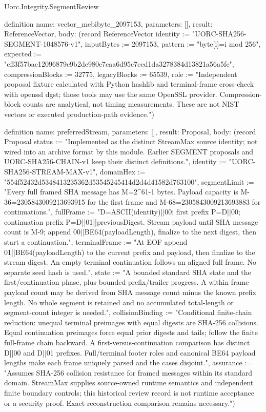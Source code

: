 \begin{lexlean}{Uorc.Integrity.SegmentReview}
\begin{semanticmodule}
definition{
  name: vector_mebibyte_2097153,
  parameters: [],
  result: ReferenceVector,
  body: (record ReferenceVector {identity := "UORC-SHA256-SEGMENT-1048576-v1", inputBytes := 2097153, pattern := "byte[i]=i mod 256", expected := "cff3f57bac12096879c9b2de980e7caa6d95c7eed1da3278384d13821a56a5fe", compressionBlocks := 32775, legacyBlocks := 65539, role := "Independent proposal fixture calculated with Python hashlib and terminal-frame cross-check with openssl dgst; those tools may use the same OpenSSL provider. Compression-block counts are analytical, not timing measurements. These are not NIST vectors or executed production-path evidence."})
}

definition{
  name: preferredStream,
  parameters: [],
  result: Proposal,
  body: (record Proposal {status := "Implemented as the distinct StreamMax source identity; not wired into an archive format by this module. Earlier SEGMENT proposals and UORC-SHA256-CHAIN-v1 keep their distinct definitions.", identity := "UORC-SHA256-STREAM-MAX-v1", domainHex := "554f52432d5348413235362d53545245414d2d4d41582d763100", segmentLimit := "Every full framed SHA message has M=2^61-1 bytes. Payload capacity is M-36=2305843009213693915 for the first frame and M-68=2305843009213693883 for continuations.", fullFrame := "D=ASCII(identity)||00; first prefix P=D||00; continuation prefix P=D||01||previousDigest. Stream payload until SHA message count is M-9; append 00||BE64(payloadLength), finalize to the next digest, then start a continuation.", terminalFrame := "At EOF append 01||BE64(payloadLength) to the current prefix and payload, then finalize to the stream digest. An empty terminal continuation follows an aligned full frame. No separate seed hash is used.", state := "A bounded standard SHA state and the first/continuation phase, plus bounded prefix/trailer progress. A within-frame payload count may be derived from SHA message count minus the known prefix length. No whole segment is retained and no accumulated total-length or segment-count integer is needed.", collisionBinding := "Conditional finite-chain reduction: unequal terminal preimages with equal digests are SHA-256 collisions. Equal continuation preimages force equal prior digests and tails; follow the finite full-frame chain backward. A first-versus-continuation comparison has distinct D||00 and D||01 prefixes. Full/terminal footer roles and canonical BE64 payload lengths make each frame uniquely parsed and the cases disjoint.", assurance := "Assumes SHA-256 collision resistance for framed messages within its standard domain. StreamMax supplies source-owned runtime semantics and independent finite boundary controls; this historical review record is not runtime acceptance or a security proof. Exact reconstruction comparison remains necessary."})
}


\end{semanticmodule}
\end{lexlean}

